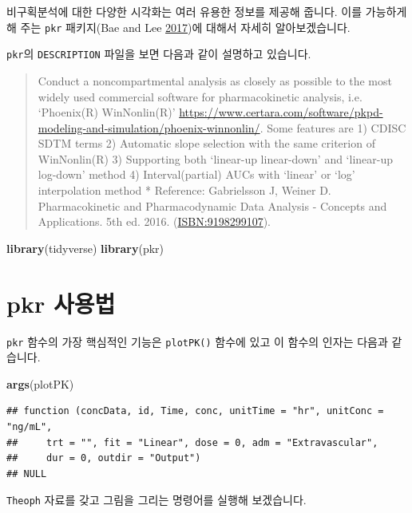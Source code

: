 \documentclass[12pt,]{krantz}
\newenvironment{Shaded}{\begin{snugshade}}{\end{snugshade}}
\newcommand{\KeywordTok}[1]{\textcolor[rgb]{0.13,0.29,0.53}{\textbf{#1}}}
\newcommand{\NormalTok}[1]{#1}
\theoremstyle{definition}
\theoremstyle{definition}
\theoremstyle{definition}
\theoremstyle{remark}
\begin{document}
비구획분석에 대한 다양한 시각화는 여러 유용한 정보를 제공해 줍니다. 이를
가능하게 해 주는 \texttt{pkr} 패키지(Bae and Lee
\protect\hyperlink{ref-R-pkr}{2017})에 대해서 자세히 알아보겠습니다.

\texttt{pkr}의 \texttt{DESCRIPTION} 파일을 보면 다음과 같이 설명하고
있습니다.

\begin{quote}
Conduct a noncompartmental analysis as closely as possible to the most
widely used commercial software for pharmacokinetic analysis, i.e.
`Phoenix(R) WinNonlin(R)'
\url{https://www.certara.com/software/pkpd-modeling-and-simulation/phoenix-winnonlin/}.
Some features are 1) CDISC SDTM terms 2) Automatic slope selection with
the same criterion of WinNonlin(R) 3) Supporting both `linear-up
linear-down' and `linear-up log-down' method 4) Interval(partial) AUCs
with `linear' or `log' interpolation method * Reference: Gabrielsson J,
Weiner D. Pharmacokinetic and Pharmacodynamic Data Analysis - Concepts
and Applications. 5th ed. 2016. (\url{ISBN:9198299107}).
\end{quote}

\begin{Shaded}
\begin{Highlighting}[]
\KeywordTok{library}\NormalTok{(tidyverse)}
\KeywordTok{library}\NormalTok{(pkr)}
\end{Highlighting}
\end{Shaded}

\section{pkr 사용법}\label{pkr-}

\texttt{pkr} 함수의 가장 핵심적인 기능은 \texttt{plotPK()} 함수에 있고
이 함수의 인자는 다음과 같습니다.

\begin{Shaded}
\begin{Highlighting}[]
\KeywordTok{args}\NormalTok{(plotPK)}
\end{Highlighting}
\end{Shaded}

\begin{verbatim}
## function (concData, id, Time, conc, unitTime = "hr", unitConc = "ng/mL", 
##     trt = "", fit = "Linear", dose = 0, adm = "Extravascular", 
##     dur = 0, outdir = "Output") 
## NULL
\end{verbatim}

\texttt{Theoph} 자료를 갖고 그림을 그리는 명령어를 실행해 보겠습니다.
\end{document}
